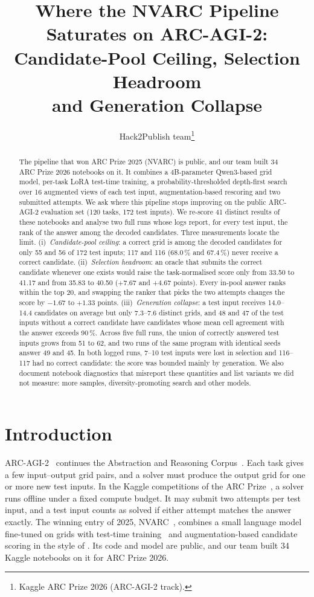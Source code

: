 \documentclass[11pt]{article}
\title{Where the NVARC Pipeline Saturates on ARC-AGI-2:\\
Candidate-Pool Ceiling, Selection Headroom\\
and Generation Collapse}
\author{Hack2Publish team\thanks{Kaggle ARC Prize 2026 (ARC-AGI-2 track).}}
\date{}
\begin{document}
\maketitle

\begin{abstract}
The pipeline that won ARC Prize 2025 (NVARC) is public, and our team built 34 ARC Prize 2026 notebooks on it. It combines a 4B-parameter Qwen3-based grid model, per-task LoRA test-time training, a probability-thresholded depth-first search over 16 augmented views of each test input, augmentation-based rescoring and two submitted attempts.
We ask where this pipeline stops improving on the public ARC-AGI-2 evaluation set (120 tasks, 172 test inputs). We re-score 41 distinct results of these notebooks and analyse two full runs whose logs report, for every test input, the rank of the answer among the decoded candidates.
Three measurements locate the limit.
(i)~\emph{Candidate-pool ceiling}: a correct grid is among the decoded candidates for only 55 and 56 of 172 test inputs; 117 and 116 (68.0\,\% and 67.4\,\%) never receive a correct candidate.
(ii)~\emph{Selection headroom}: an oracle that submits the correct candidate whenever one exists would raise the task-normalised score only from 33.50 to 41.17 and from 35.83 to 40.50 (+7.67 and +4.67 points). Every in-pool answer ranks within the top 20, and swapping the ranker that picks the two attempts changes the score by $-1.67$ to $+1.33$ points.
(iii)~\emph{Generation collapse}: a test input receives 14.0--14.4 candidates on average but only 7.3--7.6 distinct grids, and 48 and 47 of the test inputs without a correct candidate have candidates whose mean cell agreement with the answer exceeds 90\,\%.
Across five full runs, the union of correctly answered test inputs grows from 51 to 62, and two runs of the same program with identical seeds answer 49 and 45.
In both logged runs, 7--10 test inputs were lost in selection and 116--117 had no correct candidate: the score was bounded mainly by generation.
We also document notebook diagnostics that misreport these quantities and list variants we did not measure: more samples, diversity-promoting search and other models.
\end{abstract}

\section{Introduction}

ARC-AGI-2~\citep{chollet2025arcagi2} continues the Abstraction and Reasoning Corpus~\citep{chollet2019measure}. Each task gives a few input--output grid pairs, and a solver must produce the output grid for one or more new test inputs.
In the Kaggle competitions of the ARC Prize~\citep{chollet2024arcprize,arcprize2026kaggle}, a solver runs offline under a fixed compute budget. It may submit two attempts per test input, and a test input counts as solved if either attempt matches the answer exactly.
The winning entry of 2025, NVARC~\citep{nvarc2025}, combines a small language model fine-tuned on grids with test-time training~\citep{akyurek2024ttt} and augmentation-based candidate scoring in the style of \citet{franzen2025poe}.
Its code and model are public, and our team built 34 Kaggle notebooks on it for ARC Prize 2026.
\end{document}
